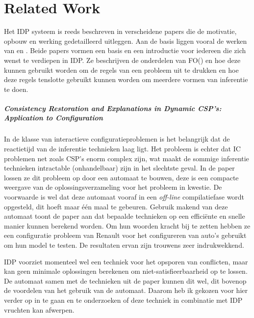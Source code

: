 \chapter{Related Work}
\label{cha:relatedwork}

Het IDP systeem is reeds beschreven in verscheidene papers die de motivatie, opbouw en werking gedetailleerd uitleggen. Aan de basis liggen vooral de werken van \citep{de2014predicate} en \citep{de2014separating}. Beide papers vormen een basis en een introductie voor iedereen die zich wenst te verdiepen in IDP. Ze beschrijven de onderdelen van FO(\textperiodcentered) en hoe deze kunnen gebruikt worden om de regels van een probleem uit te drukken en hoe deze regels tenslotte gebruikt kunnen worden om meerdere vormen van inferentie te doen. 

\paragraph{Consistency Restoration and Explanations in Dynamic CSP's: Application to Configuration \cite{amilhastre2002consistency}}
In de klasse van interactieve configuratieproblemen is het belangrijk dat de reactietijd van de inferentie technieken laag ligt. Het probleem is echter dat IC problemen net zoals CSP's enorm complex zijn, wat maakt de sommige inferentie technieken intractable (onhandelbaar) zijn in het slechtste geval. In de paper lossen ze dit probleem op door een automaat te bouwen, deze is een compacte weergave van de oplossingsverzameling voor het probleem in kwestie. De voorwaarde is wel dat deze automaat vooraf in een \textit{off-line} compilatiefase wordt opgesteld, dit hoeft maar \'{e}\'{e}n maal te gebeuren. Gebruik makend van deze automaat toont de paper aan dat bepaalde technieken op een effici\"{e}nte en snelle manier kunnen berekend worden. Om hun woorden kracht bij te zetten hebben ze een configuratie probleem van Renault voor het configureren van auto's gebruikt om hun model te testen. De resultaten ervan zijn trouwens zeer indrukwekkend. 

IDP voorziet momenteel wel een techniek voor het opsporen van conflicten, maar kan geen minimale oplossingen berekenen om niet-satisfieerbaarheid op te lossen. De automaat samen met de technieken uit de paper kunnen dit wel, dit bovenop de voordelen van het gebruik van de automaat. Daarom heb ik gekozen voor hier verder op in te gaan en te onderzoeken of deze techniek in combinatie met IDP vruchten kan afwerpen.

